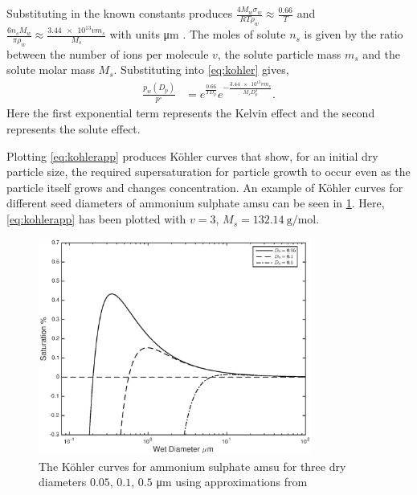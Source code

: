 			Substituting in the known constants produces $\frac{4 M_w \sigma_w}{R T \rho_w} \approx \frac{0.66}{T}$ and $\frac{6 n_s M_w}{\pi \rho_w} \approx \frac{\num{3.44e13} v m_s}{M_s}$ with units \si{\micro\meter} \citep[p. 770]{seinfeld2012atmospheric}. The moles of solute $n_s$ is given by the ratio between the number of ions per molecule $v$, the solute particle mass $m_s$ and the solute molar mass $M_s$. Substituting into \cref{eq:kohler} gives,
			\begin{align}
				\frac{p_w(D_p)}{p^\circ} &= e^{\frac{0.66}{T D_p}} e^{-\frac{\num{3.44e13} v m_s}{M_s D_p^3}}.
				\label{eq:kohlerapp}
			\end{align}
			Here the first exponential term represents the Kelvin effect and the second represents the solute effect.

			Plotting \cref{eq:kohlerapp} produces K\"{o}hler curves that show, for an initial dry particle size, the required supersaturation for particle growth to occur even as the particle itself grows and changes concentration. An example of K\"{o}hler curves for different seed diameters of ammonium sulphate \gls{amsu} can be seen in \cref{fig:kohleras}. Here, \cref{eq:kohlerapp} has been plotted with $v = 3$, $M_s = \SI{132.14}{\gram\per\mole}$.

			\begin{figure}[!htb]
			    \centering
			    \includegraphics[width=0.8\textwidth]{Fig/as_Kcurve.eps}
			    \caption{The K\"{o}hler curves for ammonium sulphate \gls{amsu} for three dry diameters $0.05$, $0.1$, $0.5$ \si{\micro\meter} using approximations from \citet[p. 770]{seinfeld2012atmospheric} }
			    \label{fig:kohleras}
			\end{figure}


